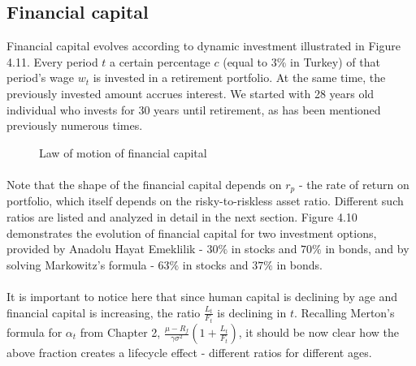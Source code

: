 \subsection{Financial capital}

Financial capital evolves according to dynamic investment illustrated in Figure 4.11. Every period $t$ a certain percentage $c$ (equal to $3\%$ in Turkey) of that period's wage $w_t$ is invested in a retirement portfolio. At the same time, the previously invested amount accrues interest. We started with 28 years old individual who invests for 30 years until retirement, as has been mentioned previously numerous times.

\begin{figure}[h]
	\centering
	\caption{Law of motion of financial capital}
\end{figure}

\paragraph{}Note that the shape of the financial capital depends on $r_p$ - the rate of return on portfolio, which itself depends on the risky-to-riskless asset ratio. Different such ratios are listed and analyzed in detail in the next section. Figure 4.10 demonstrates the evolution of financial capital for two investment options, provided by Anadolu Hayat Emeklilik - $30\%$ in stocks and $70\%$ in bonds, and by solving Markowitz's formula - $63\%$ in stocks and $37\%$ in bonds.

\paragraph{}It is important to notice here that since human capital is declining by age and financial capital is increasing, the ratio $\frac{L_t}{F_t}$ is declining in $t$. Recalling Merton's formula for $\alpha_t$ from Chapter 2, $\frac{\mu - R_f}{\gamma \sigma^2}(1+\frac{L_t}{F_t})$, it should be now clear how the above fraction creates a lifecycle effect - different ratios for different ages. 

